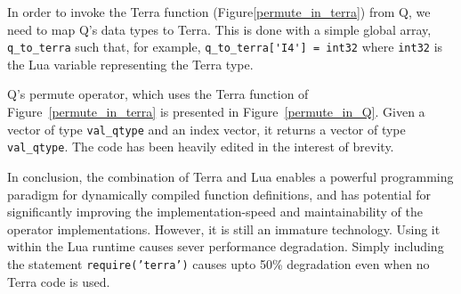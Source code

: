 In order to invoke the Terra function (Figure\ref{permute_in_terra}) from Q, we
need to map Q's data types to Terra. This is done with a simple global 
array, \verb+q_to_terra+ such that, for example, 
\verb+q_to_terra['I4'] = int32+  where {\tt int32} is the Lua variable representing the Terra type.

Q's permute operator, which uses the Terra function of
Figure~\ref{permute_in_terra} 
is presented in Figure~\ref{permute_in_Q}. 
Given a vector of type {\tt val\_qtype} and an index vector, it 
returns a vector of type {\tt val\_qtype}.
The code has been heavily edited in the interest of brevity.

\begin{figure}
\centering
{}
\end{figure}

In conclusion,
the combination of Terra and Lua enables a powerful programming paradigm for dynamically compiled function definitions, and has potential for significantly improving the implementation-speed and maintainability of the operator implementations. 
However, it is
still an immature technology. Using it within the Lua runtime causes sever
performance degradation. Simply including the statement 
{\tt require('terra')} causes upto 50\% degradation even when no Terra code is
used. 

